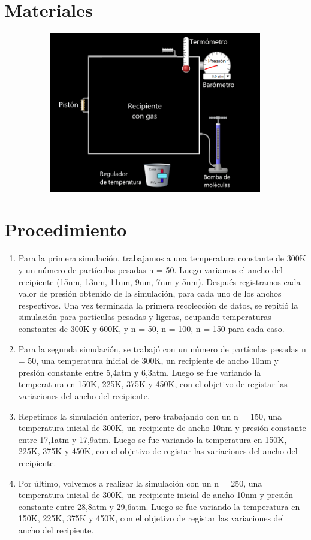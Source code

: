 \documentclass[]{article}
\begin{document}
\section{Materiales}
\begin{figure}[h!]
      \centering
      \includegraphics[width= 12cm, height= 7cm]{imag/Materiales.png}
\end{figure}


\section{Procedimiento}
\begin{enumerate}
    \item Para la primera simulación, trabajamos a una temperatura constante de 300K y un número de partículas pesadas n = 50. Luego variamos el ancho del recipiente (15nm, 13nm, 11nm,
    9nm, 7nm y 5nm). Después registramos cada valor de presión obtenido de la simulación, para cada
    uno de los anchos respectivos.
    Una vez terminada la primera recolección de datos, se repitió la simulación para partículas pesadas y ligeras, ocupando temperaturas constantes de 300K y 600K, y n = 50, n = 100, n = 150
    para cada caso. 

    \item Para la segunda simulación, se trabajó con un número de partículas pesadas n = 50, una
    temperatura inicial de 300K, un recipiente de ancho 10nm  y presión constante entre 5,4atm y 6,3atm.
    Luego se fue variando la temperatura en 150K, 225K, 375K y 450K, con el objetivo de registar las variaciones del ancho del recipiente.
    

    \item   Repetimos la simulación anterior, pero trabajando con un n = 150,  una temperatura inicial de 300K,  un recipiente de ancho 10nm y presión constante entre 17,1atm y 17,9atm. 
    Luego se fue variando la temperatura en 150K, 225K, 375K y 450K, con el objetivo de registar las variaciones del ancho del recipiente. 
    
    \item  Por último, volvemos a realizar la simulación con un n = 250, una temperatura inicial de 300K, un
    recipiente inicial de ancho 10nm y presión constante entre 28,8atm y 29,6atm.
    Luego se fue variando la temperatura en 150K, 225K, 375K y 450K, con el objetivo de registar las variaciones del ancho del recipiente.
   
    
    
\end{enumerate}
\end{document}
